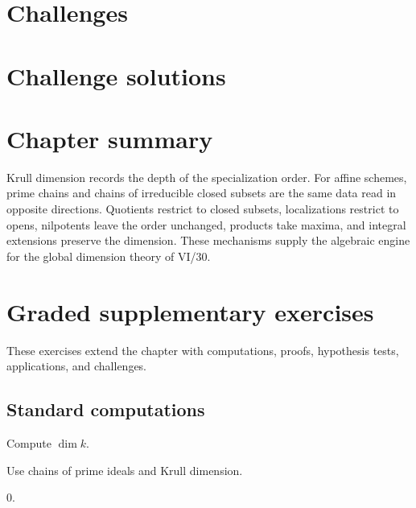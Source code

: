\section{Challenges}






\ifdefined\IncludeChallengeSolutions
\section{Challenge solutions}

\fi


\section{Chapter summary}
Krull dimension records the depth of the specialization order.  For affine schemes, prime chains and chains of
irreducible closed subsets are the same data read in opposite directions.  Quotients restrict to closed subsets,
localizations restrict to opens, nilpotents leave the order unchanged, products take maxima, and integral extensions
preserve the dimension.  These mechanisms supply the algebraic engine for the global dimension theory of VI/30.


\section{Graded supplementary exercises}
These exercises extend the chapter with computations, proofs, hypothesis tests, applications, and challenges.

\subsection*{Standard computations}

\begin{exercise}[Field]\label{exr:vi29-expand-01}
Compute $\dim k$.
\end{exercise}
\begin{hint}
Use chains of prime ideals and Krull dimension.
\end{hint}
\begin{solution}
$0$.
\end{solution}


